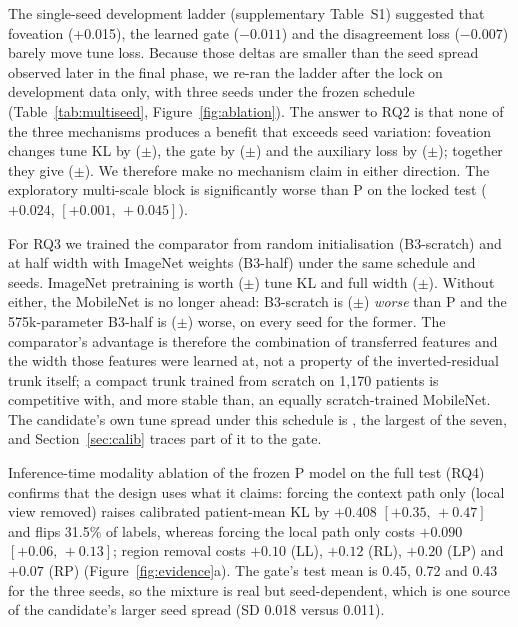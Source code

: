 \documentclass[sigconf,anonymous]{acmart}
\newcommand{\ci}[2]{[#1,\,#2]}
\begin{document}
The single-seed development ladder (supplementary Table~S1) suggested that foveation (+0.015), the learned gate ($-0.011$) and the disagreement loss ($-0.007$) barely move tune loss. Because those deltas are smaller than the seed spread observed later in the final phase, we re-ran the ladder after the lock on development data only, with three seeds under the frozen schedule (Table~\ref{tab:multiseed}, Figure~\ref{fig:ablation}). The answer to RQ2 is that none of the three mechanisms produces a benefit that exceeds seed variation: foveation changes tune KL by \dfoveation{} ($\pm$\dsdfoveation), the gate by \dgate{} ($\pm$\dsdgate) and the auxiliary loss by \daux{} ($\pm$\dsdaux); together they give \dall{} ($\pm$\dsdall). We therefore make no mechanism claim in either direction. The exploratory multi-scale block is significantly worse than P on the locked test ($+0.024$, $\ci{+0.001}{+0.045}$).

For RQ3 we trained the comparator from random initialisation (B3-scratch) and at half width with ImageNet weights (B3-half) under the same schedule and seeds. ImageNet pretraining is worth \dpretrain{} ($\pm$\dsdpretrain) tune KL and full width \dwidth{} ($\pm$\dsdwidth). Without either, the MobileNet is no longer ahead: B3-scratch is \dscratchvsp{} ($\pm$\dsdscratchvsp) \emph{worse} than P and the 575k-parameter B3-half is \dhalfvsp{} ($\pm$\dsdhalfvsp) worse, on every seed for the former. The comparator's advantage is therefore the combination of transferred features and the width those features were learned at, not a property of the inverted-residual trunk itself; a compact trunk trained from scratch on 1,170 patients is competitive with, and more stable than, an equally scratch-trained MobileNet. The candidate's own tune spread under this schedule is \sdP{}, the largest of the seven, and Section~\ref{sec:calib} traces part of it to the gate.

Inference-time modality ablation of the frozen P model on the full test (RQ4) confirms that the design uses what it claims: forcing the context path only (local view removed) raises calibrated patient-mean KL by $+0.408$ $\ci{+0.35}{+0.47}$ and flips 31.5\% of labels, whereas forcing the local path only costs $+0.090$ $\ci{+0.06}{+0.13}$; region removal costs $+0.10$ (LL), $+0.12$ (RL), $+0.20$ (LP) and $+0.07$ (RP) (Figure~\ref{fig:evidence}a). The gate's test mean is 0.45, 0.72 and 0.43 for the three seeds, so the mixture is real but seed-dependent, which is one source of the candidate's larger seed spread (SD 0.018 versus 0.011).
\end{document}
